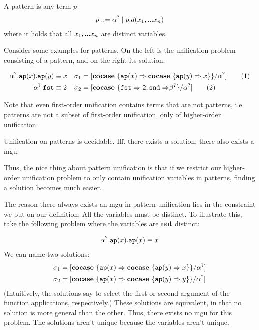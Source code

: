 \documentclass[twoside,12pt,a4paper]{article}
\begin{document}
\begin{definition}[Pattern]
    A pattern is any term $p$ 
    \begin{align*}
        p ::= \alpha^? \;|\; p.d(x_1,...x_n)
    \end{align*}
    where it holds that all $x_1,...x_n$ are distinct variables.
\end{definition}

Consider some examples for patterns. On the left is the unification problem consisting of a pattern, and on the right its solution:
\begin{example}[Pattern]
    \begin{align*}
        \alpha^?.\texttt{ap}(x).\texttt{ap}(y)&\equiv x &\sigma_1 &= [\textbf{cocase}\ \{\texttt{ap}(x)\Rightarrow\textbf{cocase}\ \{\texttt{ap}(y)\Rightarrow x\}\}/\alpha^?] \tag{1}\\
        \alpha^?.\mathtt{fst} &\equiv 2 &\sigma_2 &= [\textbf{cocase}\ \{\mathtt{fst\Rightarrow 2, snd \Rightarrow}\beta^?\}/\alpha^?] \tag{2}
    \end{align*}   
\end{example}

Note that even first-order unification contains terms that are not patterns, i.e.
patterns are not a subset of first-order unification, only of higher-order unification.

\begin{theorem}
    Unification on patterns is decidable.
    Iff. there exists a solution, there also exists a mgu. \cite{10.1093/logcom/1.4.497}
\end{theorem}
Thus, the nice thing about pattern unification is that if we restrict our higher-order unification problem to only contain unification variables in patterns, 
finding a solution becomes much easier. 

The reason there always exists an mgu in pattern unification lies in the constraint we put on our definition: All the variables must be distinct. 
To illustrate this, take the following problem where the variables are \textbf{not} distinct:
\begin{example}
    \begin{align*}
        \alpha^?.\texttt{ap}(x).\texttt{ap}(x)\equiv x
    \end{align*}  
    We can name two solutions:
\begin{align*}
    \sigma_1 &= [\textbf{cocase}\ \{\texttt{ap}(x)\Rightarrow \textbf{cocase}\ \{\texttt{ap}(y)\Rightarrow x\}\}/\alpha^?]\\
    \sigma_2 &=[\textbf{cocase}\ \{\texttt{ap}(x)\Rightarrow \textbf{cocase}\ \{\texttt{ap}(y)\Rightarrow y\}\}/\alpha^?]  
\end{align*}
(Intuitively, the solutions say to select the first or second argument of the function applications, respectively.)
These solutions are equivalent, in that no solution is more general than the other. Thus, there exists no mgu for this problem.
The solutions aren't unique because the variables aren't unique.  
\end{example}
\end{document}
